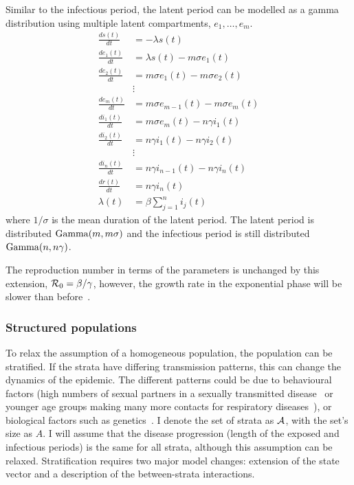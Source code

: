 \documentclass[thesis.tex]{subfiles}
\begin{document}
Similar to the infectious period, the latent period can be modelled as a gamma distribution using multiple latent compartments, $e_1, \dots, e_m$.
\begin{align}
\frac{ds(t)}{dt} &= -\lambda s(t) \\
\frac{de_1(t)}{dt} &= \lambda s(t) - m\sigma e_1(t) \\
\frac{de_2(t)}{dt} &= m\sigma e_1(t) - m \sigma e_2(t) \\
&\vdots \nonumber \\
\frac{de_m(t)}{dt} &= m\sigma e_{m-1}(t) - m \sigma e_m(t) \\
\frac{di_1(t)}{dt} &= m\sigma e_m(t) - n\gamma i_1(t) \\
\frac{di_2(t)}{dt} &= n\gamma i_1(t) - n \gamma i_2(t) \\
&\vdots \nonumber \\
\frac{di_n(t)}{dt} &= n\gamma i_{n-1}(t) - n \gamma i_n(t) \\
\frac{dr(t)}{dt} &= n\gamma i_n(t) \\
\lambda(t) &= \beta \sum_{j=1}^n i_j(t)
\end{align}
where $1/\sigma$ is the mean duration of the latent period.
The latent period is distributed $\operatorname{Gamma}(m, m\sigma)$ and the infectious period is still distributed $\operatorname{Gamma}(n, n\gamma)$.

The reproduction number in terms of the parameters is unchanged by this extension, \ie $\mathcal{R}_{0} = \beta / \gamma$, however, the growth rate in the exponential phase will be slower than before~\autocite[41]{keelingModeling}.

\subsubsection{Structured populations} \label{SEIR:sec:structured-populations}

To relax the assumption of a homogeneous population, the population can be stratified.
If the strata have differing transmission patterns, this can change the dynamics of the epidemic.
The different patterns could be due to behavioural factors (\eg high numbers of sexual partners in a sexually transmitted disease~\autocite[69]{keelingModeling} or younger age groups making many more contacts for respiratory diseases~\autocite[176]{andersonInfectious}), or biological factors such as genetics~\autocite[208]{andersonInfectious}.
I denote the set of strata as $\mathcal{A}$, with the set's size as $A$.
I will assume that the disease progression (\ie length of the exposed and infectious periods) is the same for all strata, although this assumption can be relaxed.
Stratification requires two major  model changes: extension of the state vector and a description of the between-strata interactions.
\end{document}
